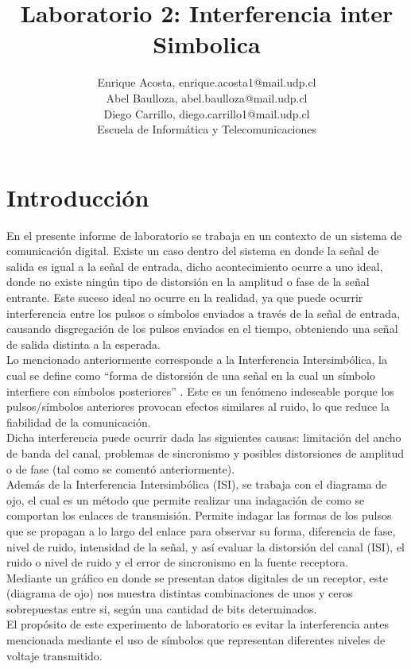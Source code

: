 \documentclass[lettersize,journal]{IEEEtran}
\begin{document}
\title{Laboratorio 2: Interferencia inter Simbolica}

\author{Enrique Acosta, enrique.acosta1@mail.udp.cl \\
Abel Baulloza, abel.baulloza@mail.udp.cl \\
Diego Carrillo, diego.carrillo1@mail.udp.cl\\

Escuela de Informática y Telecomunicaciones \\ 
}

\maketitle



\section{Introducción}\label{sec:introduccion}
En el presente informe de laboratorio se trabaja en un contexto de un sistema de comunicación digital. Existe un caso dentro del sistema en donde la señal de salida es igual a la señal de entrada, dicho acontecimiento ocurre a uno ideal, donde no existe ningún tipo de distorsión en la amplitud o fase de la señal entrante. Este suceso ideal no ocurre en la realidad, ya que puede ocurrir interferencia entre los pulsos o símbolos enviados a través de la señal de entrada, causando disgregación de los pulsos enviados en el tiempo, obteniendo una señal de salida distinta a la esperada.\\
Lo mencionado anteriormente corresponde a la Interferencia Intersimbólica, la cual se define como ``forma de distorsión de una señal en la cual un símbolo interfiere con símbolos posteriores'' \cite{ref1}. Este es un fenómeno indeseable porque los pulsos/símbolos anteriores provocan efectos similares al ruido, lo que reduce la fiabilidad de la comunicación.\\
Dicha interferencia puede ocurrir dada las siguientes causas: limitación del ancho de banda del canal, problemas de sincronismo y posibles distorsiones de amplitud o de fase (tal como se comentó anteriormente).\\
Además de la Interferencia Intersimbólica (ISI), se trabaja con el diagrama de ojo, el cual es un método que permite realizar una indagación de como se comportan los enlaces de transmisión. Permite indagar las formas de los pulsos que se propagan a lo largo del enlace para observar su forma, diferencia de fase, nivel de ruido, intensidad de la señal, y así evaluar la distorsión del canal (ISI), el ruido o nivel de ruido y el error de sincronismo en la fuente receptora. 
\cite{ref2}\\
Mediante un gráfico en donde se presentan datos digitales de un receptor, este (diagrama de ojo) nos muestra distintas combinaciones de unos y ceros sobrepuestas entre si, según una cantidad de bits determinados\cite{ref2}. \\
El propósito de este experimento de laboratorio es evitar la interferencia antes mencionada mediante el uso de símbolos que representan diferentes niveles de voltaje transmitido.
\end{document}
